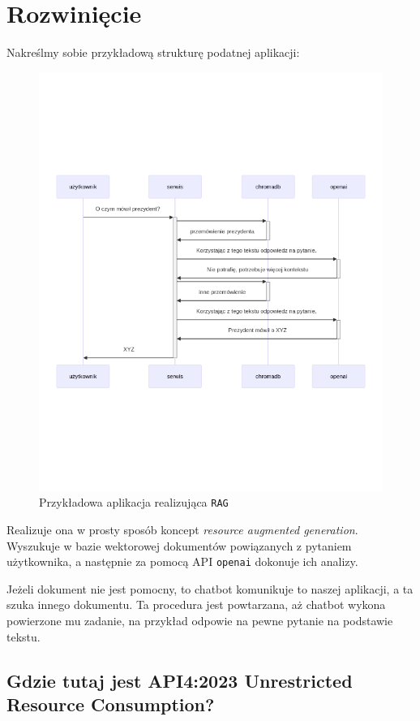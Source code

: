 \documentclass[12pt,a4paper]{article}
\begin{document}
\newpage

\section{Rozwinięcie}

Nakreślmy sobie przykładową strukturę podatnej aplikacji:

\begin{figure}[h]
  \includegraphics[height=\textwidth]{media/structure.png}
  \centering
  \caption{Przykładowa aplikacja realizująca \texttt{RAG}}
\end{figure}

Realizuje ona w prosty sposób koncept \emph{resource augmented generation}.
Wyszukuje w bazie wektorowej dokumentów powiązanych z pytaniem użytkownika, a
następnie za pomocą API \texttt{openai} dokonuje ich analizy.

Jeżeli dokument nie jest pomocny, to chatbot komunikuje to naszej aplikacji, a 
ta szuka innego dokumentu. Ta procedura jest powtarzana, aż chatbot wykona
powierzone mu zadanie, na przykład odpowie na pewne pytanie na podstawie tekstu.

\subsection*{Gdzie tutaj jest API4:2023 Unrestricted Resource
Consumption?}
\end{document}
